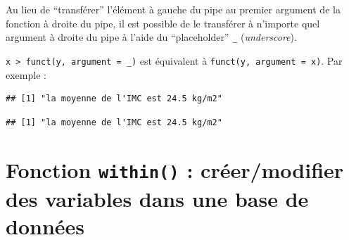 \documentclass[
]{book}
\newenvironment{Shaded}{\begin{snugshade}}{\end{snugshade}}
\newcommand{\AttributeTok}[1]{\textcolor[rgb]{0.13,0.29,0.53}{#1}}
\newcommand{\CommentTok}[1]{\textcolor[rgb]{0.56,0.35,0.01}{\textit{#1}}}
\newcommand{\ConstantTok}[1]{\textcolor[rgb]{0.56,0.35,0.01}{#1}}
\newcommand{\DecValTok}[1]{\textcolor[rgb]{0.00,0.00,0.81}{#1}}
\newcommand{\DocumentationTok}[1]{\textcolor[rgb]{0.56,0.35,0.01}{\textbf{\textit{#1}}}}
\newcommand{\FunctionTok}[1]{\textcolor[rgb]{0.13,0.29,0.53}{\textbf{#1}}}
\newcommand{\NormalTok}[1]{#1}
\newcommand{\SpecialCharTok}[1]{\textcolor[rgb]{0.81,0.36,0.00}{\textbf{#1}}}
\newcommand{\StringTok}[1]{\textcolor[rgb]{0.31,0.60,0.02}{#1}}
\begin{document}
Au lieu de ``transférer'' l'élément à gauche du pipe au premier argument de la fonction à droite du pipe, il est possible de le transférer à n'importe quel argument à droite du pipe à l'aide du ``placeholder'' \texttt{\_} (\emph{underscore}).

\texttt{x\ \textbar{}\textgreater{}\ funct(y,\ argument\ =\ \_)} est équivalent à \texttt{funct(y,\ argument\ =\ x)}. Par exemple :

\begin{Shaded}
\end{Shaded}

\begin{verbatim}
## [1] "la moyenne de l'IMC est 24.5 kg/m2"
\end{verbatim}

\begin{Shaded}
\end{Shaded}

\begin{verbatim}
## [1] "la moyenne de l'IMC est 24.5 kg/m2"
\end{verbatim}

\section{\texorpdfstring{Fonction \texttt{within()} : créer/modifier des variables dans une base de données}{Fonction within() : créer/modifier des variables dans une base de données}}\label{fonction-within-cruxe9ermodifier-des-variables-dans-une-base-de-donnuxe9es}
\end{document}
